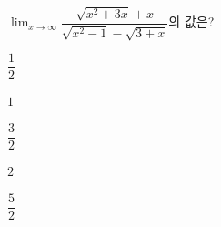$\displaystyle\lim_{x\to\infty}\dfrac{\sqrt{x^2+3x}+x}{\sqrt{x^2-1}-\sqrt{3+x}}$의 값은?
\begin{choices32}{\rule[-3ex]{0pt}{8ex}$\dfrac{1}{2}$}{\rule[-3ex]{0pt}{8ex}$1$}{\rule[-3ex]{0pt}{8ex}$\dfrac{3}{2}$}{\rule[-3ex]{0pt}{8ex}$2$}{\rule[-3ex]{0pt}{8ex}$\dfrac{5}{2}$}\end{choices32}
